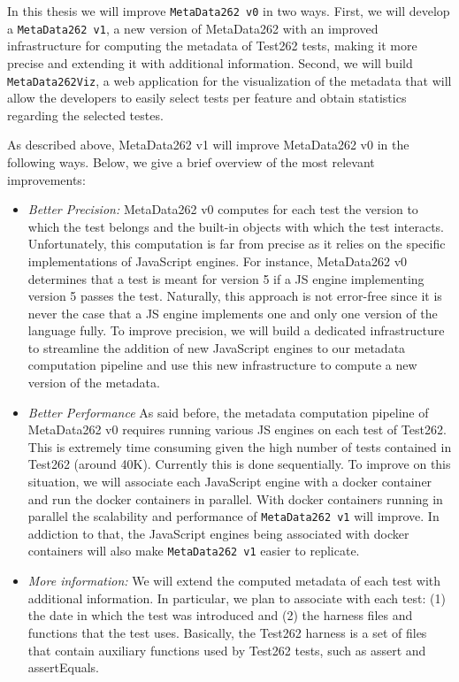 \documentclass[runningheads]{llncs}
\begin{document}
In this thesis we will improve \texttt{MetaData262 v0} in two ways. First, we will develop a \texttt{MetaData262 v1}, a new version of MetaData262 with an improved infrastructure for computing the metadata of Test262 tests, making it more precise and extending it with additional information. Second, we will build \texttt{MetaData262Viz}, a web application for the visualization of the metadata that will allow the developers to easily select tests per feature and obtain statistics regarding the selected testes.

As described above, MetaData262 v1 will improve MetaData262 v0 in the following ways. Below, we give a brief overview of the most relevant improvements:

\begin{itemize}
\item \emph{Better Precision:} MetaData262 v0 computes for each test the version to which the test belongs and the built-in objects with which the test interacts. Unfortunately, this computation is far from precise as it relies on the specific implementations of JavaScript engines. For instance, MetaData262 v0 determines that a test is meant for version 5 if a JS engine implementing version 5 passes the test. Naturally, this approach is not error-free since it is never the case that a JS engine implements one and only one version of the language fully. To improve precision, we will build a dedicated infrastructure to streamline the addition of new JavaScript engines to our metadata computation pipeline and use this new infrastructure to compute a new version of the metadata.
%
\item \emph{Better Performance} As said before, the metadata computation pipeline of MetaData262 v0 requires running various JS engines on each test of Test262. This is extremely time consuming given the high number of tests contained in Test262 (around 40K).
Currently this is done sequentially. To improve on this situation, we will associate each JavaScript engine with a docker container and run the docker containers in parallel. With docker containers running in parallel the scalability and performance of \texttt{MetaData262 v1} will improve. In addiction to that, the JavaScript engines being associated with docker containers will also make \texttt{MetaData262 v1} easier to replicate.
%
\item \emph{More information:} We will extend the computed metadata of each test with additional information. In particular, we plan to associate with each test: (1) the date in  which the test was introduced and (2) the harness files and functions that the test uses. Basically, the Test262 harness is a set of files that contain auxiliary functions used by Test262 tests, such as assert and assertEquals.
\end{itemize}
\end{document}
